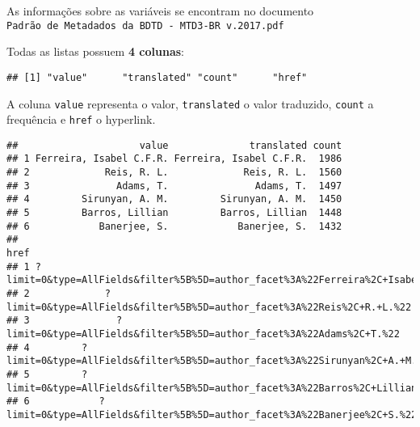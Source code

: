 \documentclass[
]{article}
\newenvironment{Shaded}{\begin{snugshade}}{\end{snugshade}}
\newcommand{\CommentTok}[1]{\textcolor[rgb]{0.56,0.35,0.01}{\textit{#1}}}
\newcommand{\FunctionTok}[1]{\textcolor[rgb]{0.00,0.00,0.00}{#1}}
\newcommand{\NormalTok}[1]{#1}
\newcommand{\SpecialCharTok}[1]{\textcolor[rgb]{0.00,0.00,0.00}{#1}}
\begin{document}
As informações sobre as variáveis se encontram no documento
\texttt{Padrão\ de\ Metadados\ da\ BDTD\ -\ MTD3-BR\ v.2017.pdf}

Todas as listas possuem \textbf{4 colunas}:

\begin{Shaded}
\end{Shaded}

\begin{verbatim}
## [1] "value"      "translated" "count"      "href"
\end{verbatim}

A coluna \texttt{value} representa o valor, \texttt{translated} o valor
traduzido, \texttt{count} a frequência e \texttt{href} o hyperlink.

\begin{Shaded}
\end{Shaded}

\begin{verbatim}
##                     value              translated count
## 1 Ferreira, Isabel C.F.R. Ferreira, Isabel C.F.R.  1986
## 2             Reis, R. L.             Reis, R. L.  1560
## 3               Adams, T.               Adams, T.  1497
## 4         Sirunyan, A. M.         Sirunyan, A. M.  1450
## 5         Barros, Lillian         Barros, Lillian  1448
## 6            Banerjee, S.            Banerjee, S.  1432
##                                                                                  href
## 1 ?limit=0&type=AllFields&filter%5B%5D=author_facet%3A%22Ferreira%2C+Isabel+C.F.R.%22
## 2             ?limit=0&type=AllFields&filter%5B%5D=author_facet%3A%22Reis%2C+R.+L.%22
## 3               ?limit=0&type=AllFields&filter%5B%5D=author_facet%3A%22Adams%2C+T.%22
## 4         ?limit=0&type=AllFields&filter%5B%5D=author_facet%3A%22Sirunyan%2C+A.+M.%22
## 5         ?limit=0&type=AllFields&filter%5B%5D=author_facet%3A%22Barros%2C+Lillian%22
## 6            ?limit=0&type=AllFields&filter%5B%5D=author_facet%3A%22Banerjee%2C+S.%22
\end{verbatim}
\end{document}
